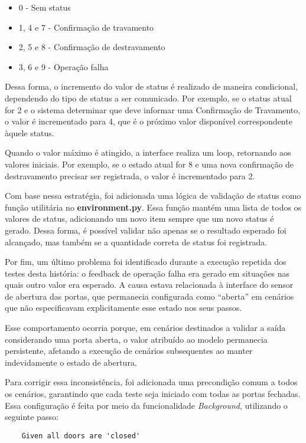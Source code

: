 \begin{itemize}
	\item 0 - Sem status
	\item 1, 4 e 7 - Confirmação de travamento
	\item 2, 5 e 8 - Confirmação de destravamento
	\item 3, 6 e 9 - Operação falha
\end{itemize}

Dessa forma, o incremento do valor de status é realizado de maneira condicional, dependendo do tipo de status a ser comunicado. Por exemplo, se o status atual 
for 2 e o sistema determinar que deve informar uma Confirmação de Travamento, o valor é incrementado para 4, que é o próximo valor disponível correspondente àquele status.

Quando o valor máximo é atingido, a interface realiza um loop, retornando aos valores iniciais. Por exemplo, se o estado atual for 8 e uma nova confirmação de 
destravamento precisar ser registrada, o valor é incrementado para 2.

Com base nessa estratégia, foi adicionada uma lógica de validação de status como função utilitária no \textbf{environment.py}. Essa função mantém uma lista de todos os valores 
de status, adicionando um novo item sempre que um novo status é gerado. Dessa forma, é possível validar não apenas se o resultado esperado foi alcançado, mas também se 
a quantidade correta de status foi registrada.

Por fim, um último problema foi identificado durante a execução repetida dos testes desta história: o feedback de operação falha era gerado em situações nas quais outro 
valor era esperado. A causa estava relacionada à interface do sensor de abertura das portas, que permanecia configurada como ``aberta'' em cenários que não especificavam 
explicitamente esse estado nos seus passos.

Esse comportamento ocorria porque, em cenários destinados a validar a saída considerando uma porta aberta, o valor atribuído ao modelo permanecia persistente, afetando 
a execução de cenários subsequentes ao manter indevidamente o estado de abertura.

Para corrigir essa inconsistência, foi adicionada uma precondição comum a todos os cenários, garantindo que cada teste seja iniciado com todas as portas fechadas. Essa 
configuração é feita por meio da funcionalidade \textit{Background}, utilizando o seguinte passo:

\begin{verbatim}
	Given all doors are 'closed'
\end{verbatim}

